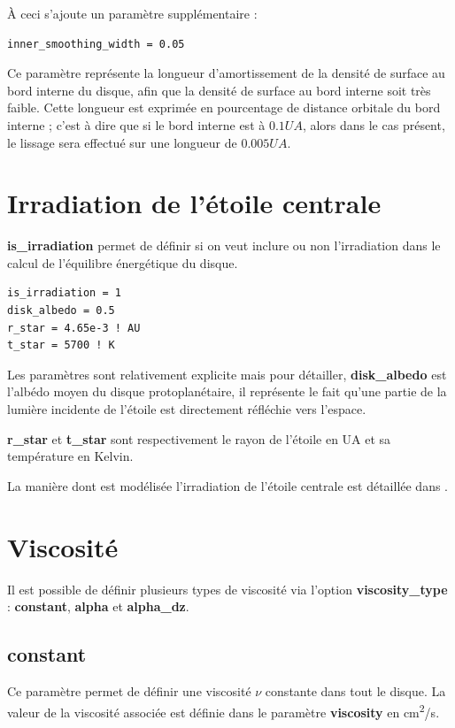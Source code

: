 \bigskip

À ceci s'ajoute un paramètre supplémentaire : 
\begin{verbatim}
inner_smoothing_width = 0.05
\end{verbatim}

Ce paramètre représente la longueur d'amortissement de la densité de surface au bord interne du disque, afin que la densité de surface au bord interne soit très faible. Cette longueur est exprimée en pourcentage de distance orbitale du bord interne ; c'est à dire que si le bord interne est à $0.1\unit{UA}$, alors dans le cas présent, le lissage sera effectué sur une longueur de $0.005\unit{UA}$.

\section{Irradiation de l'étoile centrale}
\textbf{is\_irradiation} permet de définir si on veut inclure ou non l'irradiation dans le calcul de l'équilibre énergétique du disque. 

\begin{verbatim}
is_irradiation = 1
disk_albedo = 0.5
r_star = 4.65e-3 ! AU
t_star = 5700 ! K
\end{verbatim}

Les paramètres sont relativement explicite mais pour détailler, \textbf{disk\_albedo} est l'albédo moyen du disque protoplanétaire, il représente le fait qu'une partie de la lumière incidente de l'étoile est directement réfléchie vers l'espace.

\textbf{r\_star} et \textbf{t\_star} sont respectivement le rayon de l'étoile en \unit{UA} et sa température en Kelvin.

La manière dont est modélisée l'irradiation de l'étoile centrale est détaillée dans .

\section{Viscosité}
Il est possible de définir plusieurs types de viscosité via l'option \textbf{viscosity\_type} : \textbf{constant}, \textbf{alpha} et \textbf{alpha\_dz}.

\subsection{constant}
Ce paramètre permet de définir une viscosité $\nu$ constante dans tout le disque. La valeur de la viscosité associée est définie dans le paramètre \textbf{viscosity} en \unit{cm^2/s}.

